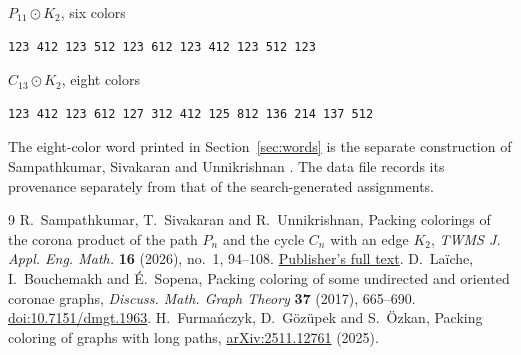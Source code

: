 \documentclass[11pt]{article}
\begin{document}
\noindent \(P_{11}\odot K_2\), six colors
\begin{Verbatim}[fontsize=\small]
123 412 123 512 123 612 123 412 123 512 123
\end{Verbatim}
\noindent \(C_{13}\odot K_2\), eight colors
\begin{Verbatim}[fontsize=\small]
123 412 123 612 127 312 412 125 812 136 214 137 512
\end{Verbatim}
The eight-color word printed in Section~\ref{sec:words} is the
separate construction of Sampathkumar, Sivakaran and
Unnikrishnan \cite[p.~107]{ssu}. The data file
 records its
provenance separately from that of the search-generated assignments.

\begin{thebibliography}{9}
 R.~Sampathkumar, T.~Sivakaran and R.~Unnikrishnan,
Packing colorings of the corona product of the path \(P_n\) and the cycle
\(C_n\) with an edge \(K_2\), \emph{TWMS J. Appl. Eng. Math.}
\textbf{16} (2026), no.~1, 94--108.
\href{https://dergipark.org.tr/en/download/article-file/5580259}{Publisher's full text}.
 D.~La\"iche, I.~Bouchemakh and \'E.~Sopena,
Packing coloring of some undirected and oriented coronae graphs,
\emph{Discuss. Math. Graph Theory} \textbf{37} (2017), 665--690.
\href{https://doi.org/10.7151/dmgt.1963}{doi:10.7151/dmgt.1963}.
H.~Furma\'nczyk, D.~G\"oz\"upek and S.~\"Ozkan,
Packing coloring of graphs with long paths,
\href{https://arxiv.org/abs/2511.12761}{arXiv:2511.12761} (2025).
\end{thebibliography}
\end{document}

